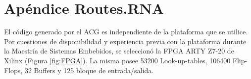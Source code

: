 \chapter{Apéndice Routes.RNA}
	\label{sec:routesRNA}
	
	El código generado por el ACG es independiente de la plataforma que se utilice. Por cuestiones de disponibilidad y experiencia previa con la plataforma durante la Maestría de Sistemas Embebidos, se seleccionó la FPGA ARTY Z7-20 de Xilinx (Figura \ref{fig:FPGA}). La misma posee 53200 Look-up-tables, 106400 Flip-Flops, 32 Buffers y 125 bloque de entrada/salida.	
	